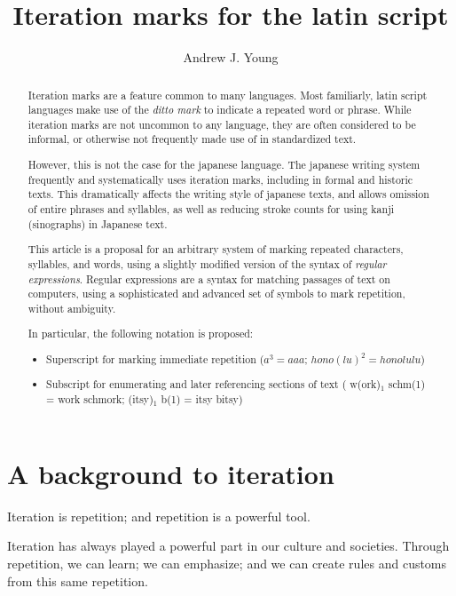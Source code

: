\documentclass{article}
\title{Iteration marks for the latin script}
\author{Andrew J. Young}
\newcommand{\s}[1]{$_{#1}$}
\begin{document}
\maketitle

\begin{abstract}
  Iteration marks are a feature common to many languages. Most familiarly, latin
  script languages make use of the \textit{ditto mark} to indicate a repeated
  word or phrase. While iteration marks are not uncommon to any language, they
  are often considered to be informal, or otherwise not frequently made use of
  in standardized text.

  However, this is not the case for the japanese language. The japanese writing
  system frequently and systematically uses iteration marks, including in formal
  and historic texts. This dramatically affects the writing style of japanese
  texts, and allows omission of entire phrases and syllables, as well as
  reducing stroke counts for using kanji (sinographs) in Japanese text.

  This article is a proposal for an arbitrary system of marking repeated
  characters, syllables, and words, using a slightly modified version of the
  syntax of \textit{regular expressions}. Regular expressions are a syntax for
  matching passages of text on computers, using a sophisticated and advanced
  set of symbols to mark repetition, without ambiguity.

  In particular, the following notation is proposed:
  \begin{itemize}
    \item Superscript for marking immediate repetition ($ a^3 = aaa $;
      $ hono(lu)^2 = honolulu $)
    \item Subscript for enumerating and later referencing sections of text (
      w(ork)\s{1} schm(1) = work schmork; (itsy)\s{1} b(1) = itsy bitsy)
  \end{itemize}
\end{abstract}

\section{A background to iteration}

Iteration is repetition; and repetition is a powerful tool.

Iteration has always played a powerful part in our culture and societies.
Through repetition, we can learn; we can emphasize; and we can create rules and
customs from this same repetition.
\end{document}

